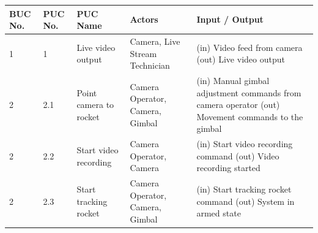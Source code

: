 \documentclass[12pt]{article}
\begin{document}
\begin{table}[H]
  \centering
  \setlength\extrarowheight{5mm}
  \begin{tabularx}{\textwidth}{p{0.4in}p{0.4in}p{1.25in}p{1in}X}
    \toprule \textbf{BUC No.}       & \textbf{PUC No.}        & \textbf{PUC Name}              &
    \textbf{Actors}                 & \textbf{Input / Output}                                    \\
    \midrule
    1                               & 1                       & Live video output              &
    Camera, Live Stream Technician
                                    &
    (in) Video feed from camera \newline
    (out) Live video output                                                                      \\
    2                               & 2.1                     & Point camera to rocket         &
    Camera Operator, Camera, Gimbal
                                    &
    (in) Manual gimbal adjustment commands from camera operator \newline
    (out) Movement commands to the gimbal                                                        \\
    2                               & 2.2                     & Start video recording          &
    Camera Operator, Camera
                                    &
    (in) Start video recording command \newline
    (out) Video recording started                                                                \\
    2                               & 2.3                     & Start tracking rocket          &
    Camera Operator, Camera, Gimbal
                                    &
    (in) Start tracking rocket command \newline
    (out) System in armed state                                                                  \\


\end{tabularx}
\end{table}
\end{document}

